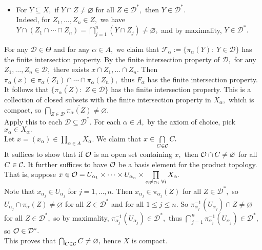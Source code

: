 \begin{frame*}
{\begin{itemize}
	\item For $Y\subseteq X,$ if $Y\cap Z\neq\varnothing$ for all $Z\in\mathcal{D}^*,$ then $Y\in\mathcal{D}^*.$ \\ Indeed, for $Z_1,\hdots,Z_n\in Z,$ we have $Y\cap(Z_1\cap\cdots\cap Z_n)=\bigcap\limits_{j=1}^n (Y\cap Z_j)\neq\varnothing,$ and by maximality, $Y\in\mathcal{D}^*.$
	\end{itemize}
	For any $\mathcal{D}\in\Theta$ and for any $\alpha\in A,$ we claim that $\mathcal{F}_{\alpha}:=\{\pi_{\alpha}(Y):\;Y\in\mathcal{D}\}$ has the finite intersection property. By the finite intersection property of $\mathcal{D},$ for any $Z_1,\hdots,Z_n\in\mathcal{D},$ there exists $x\cap Z_1,\hdots\cap Z_n.$ Then $\pi_{\alpha}(x)\in\pi_{\alpha}(Z_1)\cap\cdots\cap\pi_{\alpha}(Z_n),$ thus $F_{\alpha}$ has the finite intersection property. It follows that $\Big\{\overline{\pi_{\alpha}(Z)}:\;Z\in\mathcal{D}\Big\}$ has the finite intersection property. This is a collection of closed subsets with the finite intersection property in $X_{\alpha},$ which is compact, so $\bigcap\limits_{Z\in\mathcal{D}}\overline{\pi_{\alpha}(Z)}\neq\varnothing.$ \\
	Apply this to each $\mathcal{D}\subseteq\mathcal{D}^*.$ For each $\alpha\in A,$ by the axiom of choice, pick $x_{\alpha}\in X_{\alpha}.$ \\
	Let $x=(x_{\alpha})\in\prod_{\alpha\in A} X_{\alpha}.$ We claim that $x\in\bigcap\limits_{C\in\mathcal{C}}C.$ \\
	It suffices to show that if $\mathcal{O}$ is an open set containing $x,$ then $\mathcal{O}\cap C\neq\varnothing$ for all $C\in\mathcal{C}.$ It further suffices to have $\mathcal{O}$ be a basis element for the product topology. That is, suppose $x\in\mathcal{O}=U_{\alpha_1}\times\cdots\times U_{\alpha_n}\times\prod\limits_{\alpha\neq \alpha_i\;\forall i} X_{\alpha}.$ \\
	Note that $x_{\alpha_j}\in U_{\alpha_j}$ for $j=1,\hdots,n.$ Then $x_{\alpha_j}\in\overline{\pi_{\alpha_j}(Z)}$ for all $Z\in\mathcal{D}^*,$ so $U_{\alpha_j}\cap\pi_{\alpha}(Z)\neq\varnothing$ for all $Z\in\mathcal{D}^*$ and for all $1\leq j\leq n.$ So $\pi_{\alpha_j}^{-1}(U_{\alpha_j})\cap Z\neq\varnothing$ for all $Z\in\mathcal{D}^*,$ so by maximality, $\pi_{\alpha_j}^{-1}(U_{\alpha_j})\in\mathcal{D}^*,$ thus $\bigcap\limits_{j=1}^n \pi_{\alpha_j}^{-1}(U_{\alpha_j})\in\mathcal{D}^*,$ so $\mathcal{O}\in\mathcal{D}^*.$ \\
	This proves that $\bigcap_{C\in\mathcal{C}} C\neq\varnothing,$ hence $X$ is compact.
}
\end{frame*}

